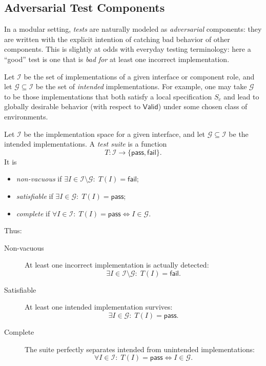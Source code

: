 \subsection{Adversarial Test Components}
\label{subsec:adversarial-tests}

In a modular setting, \emph{tests} are naturally modeled as \emph{adversarial}
components: they are written with the explicit intention of catching bad
behavior of other components. This is slightly at odds with everyday testing
terminology: here a ``good'' test is one that is \emph{bad for} at least one
incorrect implementation.

Let $\mathcal I$ be the set of implementations of a given interface or
component role, and let $\mathcal G \subseteq \mathcal I$ be the set of
\emph{intended} implementations. For example, one may take $\mathcal G$ to be those
implementations that both satisfy a local specification $S_c$ and lead to
globally desirable behavior (with respect to $\mathsf{Valid}$) under some
chosen class of environments.

\begin{definition}
Let $\mathcal I$ be the implementation space for a given interface, and let
$\mathcal G \subseteq \mathcal I$ be the intended implementations. A
\emph{test suite} is a function
\[
  T : \mathcal I \to \{\mathsf{pass}, \mathsf{fail}\}.
\]
It is
\begin{itemize}
  \item \emph{non-vacuous} if
    $\exists I \in \mathcal I \setminus \mathcal G:\; T(I) = \mathsf{fail}$;
  \item \emph{satisfiable} if
    $\exists I \in \mathcal G:\; T(I) = \mathsf{pass}$;
  \item \emph{complete} if
    $\forall I \in \mathcal I:\; T(I) = \mathsf{pass}
      \iff I \in \mathcal G$.
\end{itemize}
\end{definition}

Thus:
\begin{description}
  \item[Non-vacuous] At least one incorrect implementation is actually
    detected:
    \[
      \exists I \in \mathcal I \setminus \mathcal G:\; T(I) = \mathsf{fail}.
    \]

  \item[Satisfiable] At least one intended implementation survives:
    \[
      \exists I \in \mathcal G:\; T(I) = \mathsf{pass}.
    \]

  \item[Complete] The suite perfectly separates intended from unintended
    implementations:
    \[
      \forall I \in \mathcal I:\;
      T(I) = \mathsf{pass} \iff I \in \mathcal G.
    \]
\end{description}

